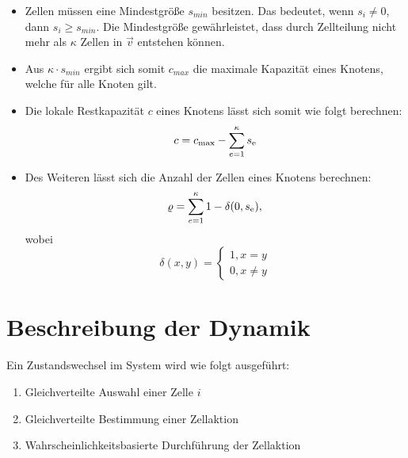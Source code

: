 \documentclass[11pt,a4paper,pointlessnumbers]{scrreprt}  %
\begin{document}
\begin{itemize}
	\item Zellen müssen eine Mindestgröße $s_{min}$ besitzen. Das bedeutet, wenn $s_{i} \neq 0$, dann $s_{i} \geq s_{min}$. Die Mindestgröße gewährleistet, dass durch Zellteilung nicht mehr als $\kappa$ Zellen in $\vec{v}$ entstehen können.
	
	\item Aus $\kappa \cdot s_{min}$ ergibt sich somit $c_{max}$ die maximale Kapazität eines Knotens, welche für alle Knoten gilt. 
	
	\item Die lokale Restkapazität $c$ eines Knotens lässt sich somit wie folgt berechnen: 
	\[ 
	c = c\textsubscript{max} - \sum_{e=1}^{\kappa} s\textsubscript{e}
	\] 
	
	\item Des Weiteren lässt sich die Anzahl der Zellen eines Knotens berechnen: 
	\[
	\varrho = \sum_{e=1}^{\kappa} 1 - \delta(0, s\textsubscript{e}),
	\]
	wobei 
	\[
	\delta(x,y) = 
	\begin{cases}
	1, x = y \\
	0, x \neq y
	\end{cases}
	\]
	
\end{itemize}

\section{Beschreibung der Dynamik}\label{sec: Dynamik}
Ein Zustandswechsel im System wird wie folgt ausgeführt: \par
\begin{enumerate}
	\item Gleichverteilte Auswahl einer Zelle $i$
	\item Gleichverteilte Bestimmung einer Zellaktion
	\item Wahrscheinlichkeitsbasierte Durchführung der Zellaktion 
\end{enumerate}
\end{document}
